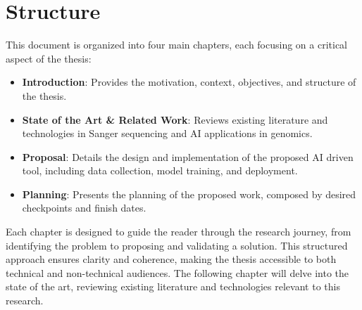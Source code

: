 \section{Structure}
\label{sec:Structure}

This document is organized into four main chapters, each focusing on a critical aspect of the thesis:

\begin{itemize}
\item \textbf{Introduction}: Provides the motivation, context, objectives, and structure of the thesis.
\item \textbf{State of the Art \& Related Work}: Reviews existing literature and technologies in Sanger sequencing and AI applications in genomics.
\item \textbf{Proposal}: Details the design and implementation of the proposed AI driven tool, including data collection, model training, and deployment.
\item \textbf{Planning}: Presents the planning of the proposed work, composed by desired checkpoints and finish dates.
\end{itemize}

Each chapter is designed to guide the reader through the research journey, from identifying the problem to proposing and validating a solution. This structured approach ensures clarity and coherence, making the thesis accessible to both technical and non-technical audiences.
The following chapter will delve into the state of the art, reviewing existing literature and technologies relevant to this research.

